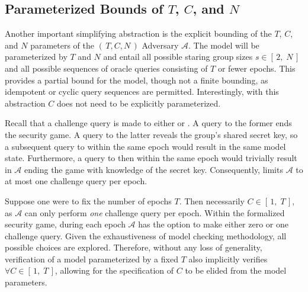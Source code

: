 \documentclass[runningheads]{llncs}
\newcommand{\Adversary}{\ensuremath{\mathcal{A}}\xspace}
\newcommand{\NumericRange}[2]{\ensuremath{\left[\,#1,\; #2\,\right]}\xspace}
\begin{document}

\subsection{Parameterized Bounds of $T$, $C$, and $N$}

Another important simplifying abstraction is the explicit bounding of the $T$, $C$, and $N$ parameters of the \((\,T, C, N\,)\) Adversary \Adversary.
The model will be parameterized by $T$ and $N$ and entail all possible staring group sizes $s \in \NumericRange{2}{N}$ and all possible sequences of oracle queries consisting of $T$ or fewer epochs.
This provides a partial bound for the model, though not a finite bounding, as idempotent or cyclic query sequences are permitted.
Interestingly, with this abstraction $C$ does not need to be explicitly parameterized.

Recall that a challenge query is made to either  or .
A query to the former ends the security game.
A query to the latter reveals the group's shared secret key, so a subsequent query to  within the same epoch would result in the same model state.
Furthermore, a query to  then  within the same epoch would trivially result in \Adversary ending the game with knowledge of the secret key.
Consequently, \CGKAsec limits \Adversary to at most one challenge query per epoch.

Suppose one were to fix the number of epochs $T$.
Then necessarily $C \in \NumericRange{1}{T}$, as \Adversary can only perform \emph{one} challenge query per epoch.
Within the formalized security game, during each epoch \Adversary has the option to make either zero or one challenge query.
Given the exhaustiveness of model checking methodology, all possible choices are explored.
Therefore, without any loss of generality, verification of a model parameterized by a fixed $T$ also implicitly verifies $\forall C \in \NumericRange{1}{T}$, allowing for the specification of $C$ to be elided from the model parameters.
\end{document}
